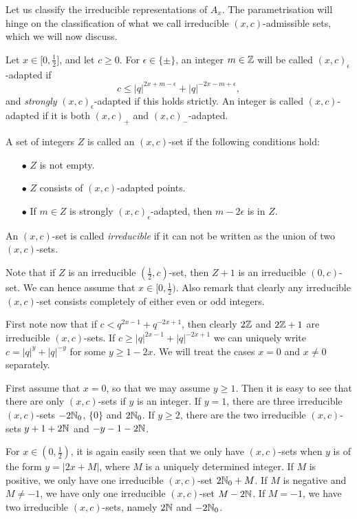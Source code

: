 
Let us classify the irreducible representations of $A_x$. The parametrisation will hinge on the classification of what we call irreducible $(x,c)$-admissible sets, which we will now discuss.

Let $x\in \lbrack 0,\frac{1}{2}\rbrack$, and let $c\geq 0$. For $\epsilon \in \{\pm\}$, an integer $m\in \mathbb{Z}$ will be called $(x,c)_{\epsilon}$-adapted if \begin{equation}\label{EqAd+}c \leq |q|^{2x+m-\epsilon}+|q|^{-2x-m+\epsilon},\end{equation} and \emph{strongly} $(x,c)_{\epsilon}$-adapted if this holds strictly. An integer is called $(x,c)$-adapted if it is both $(x,c)_+$ and $(x,c)_-$-adapted. 

A set of integers $Z$ is called an  $(x,c)$-set if the following conditions hold: \begin{itemize} 
\item[$\bullet$] $Z$ is not empty.
\item[$\bullet$] $Z$ consists of $(x,c)$-adapted points.
\item[$\bullet$] If $m\in Z$ is strongly $(x,c)_{\epsilon}$-adapted, then $m-2\epsilon$ is in $Z$.
\end{itemize}
An $(x,c)$-set is called \emph{irreducible} if it can not be written as the union of two $(x,c)$-sets.

Note that if $Z$ is an irreducible $(\frac{1}{2},c)$-set, then $Z+1$ is an irreducible $(0,c)$-set. We can hence assume that $x\in \lbrack 0,\frac{1}{2})$. Also remark that clearly any irreducible $(x,c)$-set consists completely of either even or odd integers. 

First note now that if $c< q^{2x-1}+q^{-2x+1}$, then clearly $2\mathbb{Z}$ and $2\mathbb{Z}+1$ are irreducible $(x,c)$-sets. If $c\geq |q|^{2x-1}+|q|^{-2x+1}$ we can uniquely write $c=|q|^y+|q|^{-y}$ for some $y\geq 1-2x$. We will treat the cases $x=0$ and $x\neq 0$ separately.

First assume that $x=0$, so that we may assume $y\geq 1$. Then it is easy to see that there are only $(x,c)$-sets if $y$ is an integer. If $y=1$,  there are three irreducible $(x,c)$-sets $-2\mathbb{N}_0$, $\{0\}$ and $2\mathbb{N}_0$. If $y\geq 2$,  there are the two irreducible $(x,c)$-sets $y+1+2\mathbb{N}$ and $-y-1-2\mathbb{N}$.

For $x\in (0,\frac{1}{2})$, it is again easily seen that we only have $(x,c)$-sets when $y$ is of the form $y=|2x+M|$, where $M$ is a uniquely determined integer. If $M$ is positive, we only have one irreducible $(x,c)$-set $2\mathbb{N}_0+M$. If $M$ is negative and $M\neq -1$, we have only one irreducible $(x,c)$-set  $M-2\mathbb{N}$. If $M=-1$, we have two irreducible $(x,c)$-sets, namely $2\mathbb{N}$ and $-2\mathbb{N}_0$.

